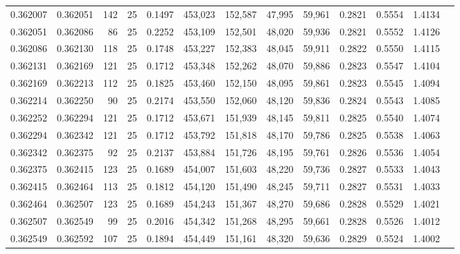 \begin{tabular}{rrrrrrrrrrrrr}
0.362007 & 0.362051 &   142 &  25 &                                     0.1497 & 453,023 & 152,587 &  47,995 &  59,961 & 0.2821 & 0.5554 & 1.4134 \\
0.362051 & 0.362086 &    86 &  25 &                                     0.2252 & 453,109 & 152,501 &  48,020 &  59,936 & 0.2821 & 0.5552 & 1.4126 \\
0.362086 & 0.362130 &   118 &  25 &                                     0.1748 & 453,227 & 152,383 &  48,045 &  59,911 & 0.2822 & 0.5550 & 1.4115 \\
0.362131 & 0.362169 &   121 &  25 &                                     0.1712 & 453,348 & 152,262 &  48,070 &  59,886 & 0.2823 & 0.5547 & 1.4104 \\
0.362169 & 0.362213 &   112 &  25 &                                     0.1825 & 453,460 & 152,150 &  48,095 &  59,861 & 0.2823 & 0.5545 & 1.4094 \\
0.362214 & 0.362250 &    90 &  25 &                                     0.2174 & 453,550 & 152,060 &  48,120 &  59,836 & 0.2824 & 0.5543 & 1.4085 \\
0.362252 & 0.362294 &   121 &  25 &                                     0.1712 & 453,671 & 151,939 &  48,145 &  59,811 & 0.2825 & 0.5540 & 1.4074 \\
0.362294 & 0.362342 &   121 &  25 &                                     0.1712 & 453,792 & 151,818 &  48,170 &  59,786 & 0.2825 & 0.5538 & 1.4063 \\
0.362342 & 0.362375 &    92 &  25 &                                     0.2137 & 453,884 & 151,726 &  48,195 &  59,761 & 0.2826 & 0.5536 & 1.4054 \\
0.362375 & 0.362415 &   123 &  25 &                                     0.1689 & 454,007 & 151,603 &  48,220 &  59,736 & 0.2827 & 0.5533 & 1.4043 \\
0.362415 & 0.362464 &   113 &  25 &                                     0.1812 & 454,120 & 151,490 &  48,245 &  59,711 & 0.2827 & 0.5531 & 1.4033 \\
0.362464 & 0.362507 &   123 &  25 &                                     0.1689 & 454,243 & 151,367 &  48,270 &  59,686 & 0.2828 & 0.5529 & 1.4021 \\
0.362507 & 0.362549 &    99 &  25 &                                     0.2016 & 454,342 & 151,268 &  48,295 &  59,661 & 0.2828 & 0.5526 & 1.4012 \\
0.362549 & 0.362592 &   107 &  25 &                                     0.1894 & 454,449 & 151,161 &  48,320 &  59,636 & 0.2829 & 0.5524 & 1.4002 \\

\end{tabular}
